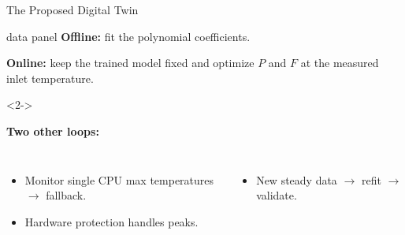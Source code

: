 \begin{frame}{The Proposed Digital Twin}
\begin{beamercolorbox}[sep=1.7mm,wd=\textwidth]{data panel}
    \small
    \textbf{Offline:} fit the polynomial coefficients.\par
    \textbf{Online:} keep the trained model fixed and optimize $P$ and $F$ at the measured inlet temperature.
  \end{beamercolorbox}
  \par\vfill
  \begin{uncoverenv}<2->
  {\small\color{black}\textbf{Two other loops:}\par}
  \medskip
  \begin{columns}[T,onlytextwidth]
      \small
      \begin{itemize}
        \setlength{\itemsep}{1pt}
        \item Monitor single CPU max temperatures $\rightarrow$ fallback.
        \item Hardware protection handles peaks.
      \end{itemize}
      \small
      \begin{itemize}
        \item New steady data $\rightarrow$ refit $\rightarrow$ validate.
      \end{itemize}
  \end{columns}
  \end{uncoverenv}
\end{frame}

